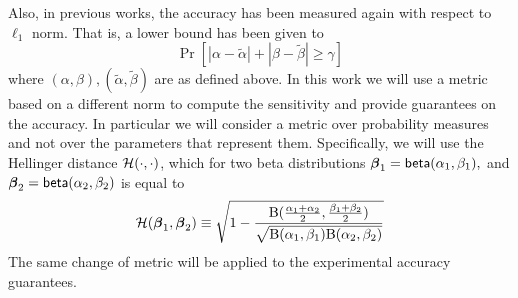 \documentclass[sigconf, anonymous]{acmart}
\begin{document}
\noindent Also, in previous works, the accuracy has been measured again with respect to
$\ell_1$ norm. That is, a lower bound has been given to
\[
  \Pr[|\alpha - \tilde\alpha| + |\beta - \tilde\beta |\geq \gamma ]
\]
where $(\alpha, \beta), (\tilde\alpha,\tilde\beta)$ are as  defined above.
In this work we will use a metric based on a different norm to compute the sensitivity
and provide guarantees on the accuracy. In particular we will consider a metric
over probability measures and not over the parameters that represent them.
Specifically, we will use the Hellinger distance $\mathcal{H}(\cdot,\cdot)$, which for two beta distributions
$\boldsymbol{\beta}_1=\mathsf{beta}(\alpha_1, \beta_1),$ and $\boldsymbol{\beta}_2=\mathsf{beta}(\alpha_2, \beta_2)$ is equal to
\[
  \mathcal{H}(\boldsymbol{\beta}_1, \boldsymbol{\beta}_2)\equiv
  \sqrt{1 - \frac{\textup{B}(\frac{\alpha_1 + \alpha_2}{2}, \frac{\beta_1 + \beta_2}{2})}{\sqrt{\textup{B}(\alpha_1,\beta_1)\textup{B}(\alpha_2,\beta_2)}}}
\]
The same change of metric will be applied to the experimental accuracy guarantees.
\end{document}
